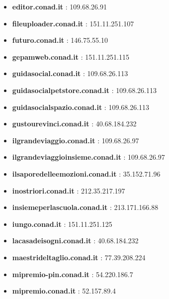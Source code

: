 \documentclass{article}
\begin{document}
\begin{itemize}
        \item \textbf{ editor.conad.it }: 109.68.26.91
    
        \item \textbf{ fileuploader.conad.it }: 151.11.251.107
    
        \item \textbf{ futuro.conad.it }: 146.75.55.10
    
        \item \textbf{ gepamweb.conad.it }: 151.11.251.115
    
        \item \textbf{ guidasocial.conad.it }: 109.68.26.113
    
        \item \textbf{ guidasocialpetstore.conad.it }: 109.68.26.113
    
        \item \textbf{ guidasocialspazio.conad.it }: 109.68.26.113
    
        \item \textbf{ gustourevinci.conad.it }: 40.68.184.232
    
        \item \textbf{ ilgrandeviaggio.conad.it }: 109.68.26.97
    
        \item \textbf{ ilgrandeviaggioinsieme.conad.it }: 109.68.26.97
    
        \item \textbf{ ilsaporedelleemozioni.conad.it }: 35.152.71.96
    
        \item \textbf{ inostriori.conad.it }: 212.35.217.197
    
        \item \textbf{ insiemeperlascuola.conad.it }: 213.171.166.88
    
        \item \textbf{ iungo.conad.it }: 151.11.251.125
    
        \item \textbf{ lacasadeisogni.conad.it }: 40.68.184.232
    
        \item \textbf{ maestrideltaglio.conad.it }: 77.39.208.224
    
        \item \textbf{ mipremio-pin.conad.it }: 54.220.186.7
    
        \item \textbf{ mipremio.conad.it }: 52.157.89.4
    

\end{itemize}
\end{document}
